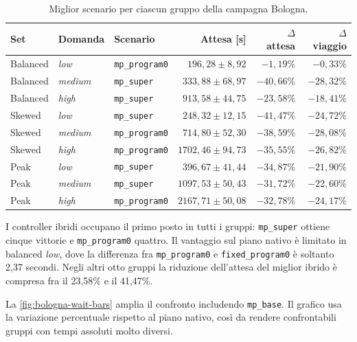 \documentclass[12pt,a4paper,oneside]{report}
\numberwithin{equation}{chapter}
\begin{document}
\begin{table}[htbp]
    \centering
    \small
    \caption{Miglior scenario per ciascun gruppo della campagna Bologna.}
    \label{tab:bologna-winners}
    \begin{tabular}{lllrrr}
        \toprule
        Set & Domanda & Scenario & Attesa [s] & $\Delta$ attesa & $\Delta$ viaggio \\
        \midrule
        Balanced & \emph{low}    & \texttt{mp\_program0} & $196{,}28\pm8{,}92$   & $-1{,}19\%$  & $-0{,}33\%$ \\
        Balanced & \emph{medium} & \texttt{mp\_super}    & $333{,}88\pm68{,}97$  & $-40{,}66\%$ & $-28{,}32\%$ \\
        Balanced & \emph{high}   & \texttt{mp\_super}    & $913{,}58\pm44{,}75$  & $-23{,}58\%$ & $-18{,}41\%$ \\
        Skewed    & \emph{low}    & \texttt{mp\_super}    & $248{,}32\pm12{,}15$  & $-41{,}47\%$ & $-24{,}72\%$ \\
        Skewed    & \emph{medium} & \texttt{mp\_program0} & $714{,}80\pm52{,}30$  & $-38{,}59\%$ & $-28{,}08\%$ \\
        Skewed    & \emph{high}   & \texttt{mp\_program0} & $1702{,}46\pm94{,}73$ & $-35{,}55\%$ & $-26{,}82\%$ \\
        Peak      & \emph{low}    & \texttt{mp\_super}    & $396{,}67\pm41{,}44$  & $-34{,}87\%$ & $-21{,}90\%$ \\
        Peak      & \emph{medium} & \texttt{mp\_super}    & $1097{,}53\pm50{,}43$ & $-31{,}72\%$ & $-22{,}60\%$ \\
        Peak      & \emph{high}   & \texttt{mp\_program0} & $2167{,}71\pm50{,}08$ & $-32{,}78\%$ & $-24{,}17\%$ \\
        \bottomrule
    \end{tabular}
\end{table}

I controller ibridi occupano il primo posto in tutti i gruppi:
\texttt{mp\_super} ottiene cinque vittorie e \texttt{mp\_program0} quattro.
Il vantaggio sul piano nativo è limitato in balanced \emph{low}, dove la differenza
fra \texttt{mp\_program0} e \texttt{fixed\_program0} è soltanto 2,37
secondi. Negli altri otto gruppi la riduzione dell'attesa del miglior ibrido è
compresa fra il 23,58\% e il 41,47\%.

La \cref{fig:bologna-wait-bars} amplia il confronto includendo
\texttt{mp\_base}. Il grafico usa la variazione percentuale rispetto al piano
nativo, così da rendere confrontabili gruppi con tempi assoluti molto diversi.
\end{document}
